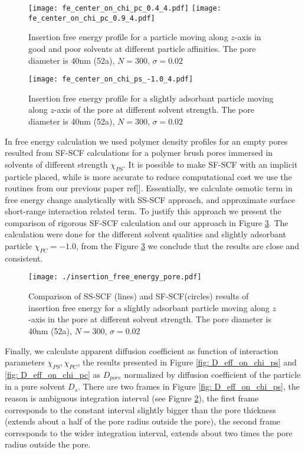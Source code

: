 \documentclass[12pt,a4paper]{article}
\begin{document}
\begin{figure}
    \texttt{[image: fe\_center\_on\_chi\_pc\_0.4\_4.pdf]}
    \texttt{[image: fe\_center\_on\_chi\_pc\_0.9\_4.pdf]}
    \caption[]{Insertion free energy profile for a particle moving along $z$-axis in good and poor solvents at different particle affinities.
    The pore diameter is 40nm (52a), $N=300$, $\sigma=0.02$
    }
    \label{fig: fe_z_on_chi_pc}
\end{figure}

\begin{figure}
    \texttt{[image: fe\_center\_on\_chi\_ps\_-1.0\_4.pdf]}
    \caption[]{Insertion free energy profile for a slightly adsorbant particle moving along $z$-axis of the pore at different solvent strength.
    The pore diameter is 40nm (52a), $N=300$, $\sigma=0.02$
    }
    \label{fig: fe_z_on_chi_ps}
\end{figure}

In free energy calculation we used polymer density profiles for an empty pores resulted from SF-SCF calculations for a polymer brush pores immersed in solvents of different strength $\chi_{PS}$.
It is possible to make SF-SCF with an implicit particle placed, while is more accurate to reduce computational cost we use the routines from our previous paper ref[].
Essentially, we calculate osmotic term in free energy change analytically with SS-SCF approach, and approximate surface short-range interaction related term.
To justify this approach we present the comparison of rigorous SF-SCF calculation and our approach in Figure \ref{fig: fe_z_comparison}.
The calculation were done for the different solvent qualities and slightly adsorbant particle $\chi_{PC} = -1.0$, from the Figure \ref{fig: fe_z_comparison} we conclude that the results are close and consistent.

\begin{figure}
    \texttt{[image: ./insertion\_free\_energy\_pore.pdf]}
    \caption[]{Comparison of SS-SCF (lines) and SF-SCF(circles) results of insertion free energy for a slightly adsorbant particle moving along $z$-axis in the pore at different solvent strength.
    The pore diameter is 40nm (52a), $N=300$, $\sigma=0.02$
    }
    \label{fig: fe_z_comparison} 
\end{figure}

Finally, we calculate apparent diffusion coefficient as function of interaction parameters $\chi_{PS}, \chi_{PC}$, the results presented in Figure \ref{fig: D_eff_on_chi_ps} and \ref{fig: D_eff_on_chi_pc} as $D_{pore}$ normalized by diffusion coefficient of the particle in a pure solvent $D_s$.
There are two frames in  Figure \ref{fig: D_eff_on_chi_ps}, the reason is ambiguous integration interval (see Figure \ref{fig: fe_z_on_chi_ps}), the first frame corresponds to the constant interval slightly bigger than the pore thickness (extends about a half of the pore radius outside the pore), the second frame corresponds to the wider integration interval, extends about two times the pore radius outside the pore.
\end{document}
